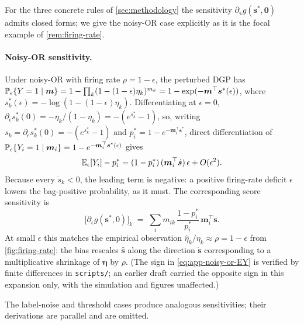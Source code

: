 For the three concrete rules of \cref{sec:methodology} the
sensitivity $\partial_{\bm\epsilon} g(\bm s^*, \bm 0)$ admits closed
forms; we give the noisy-OR case explicitly as it is the focal
example of \cref{rem:firing-rate}.

\paragraph{Noisy-OR sensitivity.}
Under noisy-OR with firing rate $\rho = 1 - \epsilon$, the perturbed
DGP has
$\mathbb{P}_\epsilon\{Y = 1 \mid \bm m\} = 1 - \prod_k (1 - (1-\epsilon)
\eta_k)^{m_k} = 1 - \exp(-\bm m^\top \bm s^*(\epsilon))$, where
$s_k^*(\epsilon) = -\log(1 - (1-\epsilon)\eta_k)$. Differentiating
at $\epsilon = 0$,
$\partial_\epsilon s_k^*(0) = -\eta_k / (1 - \eta_k) = -(e^{s_k^*} -
1)$, so, writing $\dot s_k = \partial_\epsilon s_k^*(0) =
-(e^{s_k^*} - 1)$ and $p_i^* = 1 - e^{-\bm m_i^\top \bm s^*}$,
direct differentiation of
$\mathbb{P}_\epsilon\{Y_i = 1 \mid \bm m_i\} = 1 - e^{-\bm m_i^\top \bm
s^*(\epsilon)}$ gives
\begin{equation}
  \mathbb{E}_\epsilon[Y_i] - p_i^*
  = (1 - p_i^*)\,(\bm m_i^\top \dot{\bm s})\,\epsilon
  + O(\epsilon^2).
  \label{eq:app-noisy-or-EY}
\end{equation}
Because every $\dot s_k < 0$, the leading term is negative: a
positive firing-rate deficit $\epsilon$ lowers the bag-positive
probability, as it must. The corresponding score sensitivity is
\begin{equation}
  \big[\partial_\epsilon g(\bm s^*, 0)\big]_k
  \;=\; \sum_i m_{ik}\,\frac{1 - p_i^*}{p_i^*}\,
         \bm m_i^\top \dot{\bm s}.
  \label{eq:app-noisy-or-sens}
\end{equation}
At small $\epsilon$ this matches the empirical observation
$\hat\eta_k / \eta_k \approx \rho = 1 - \epsilon$ from
\cref{fig:firing-rate}: the bias rescales $\hat{\bm s}$ along the
direction $\dot{\bm s}$ corresponding to a multiplicative shrinkage
of $\bm\eta$ by $\rho$. (The sign in \eqref{eq:app-noisy-or-EY} is
verified by finite differences in \texttt{scripts/}; an earlier
draft carried the opposite sign in this expansion only, with the
simulation and figures unaffected.)

The label-noise and threshold cases produce analogous sensitivities;
their derivations are parallel and are omitted.
